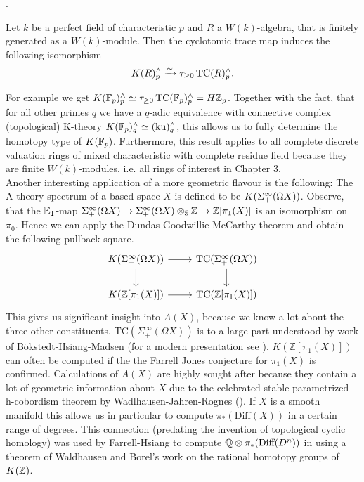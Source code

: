 \cite[Theorem~D]{HMWV}. 
\begin{thm}
    Let $k$ be a perfect field of characteristic $p$ and $R$ a $W(k)$-algebra, that is finitely generated as a $W(k)$-module. Then the cyclotomic trace map induces the following isomorphism
    \begin{align*}
        K(R)_p^{\wedge}\xrightarrow{\sim} \tau_{\geq 0}\operatorname{TC}(R)_p^{\wedge}.
    \end{align*}
\end{thm}
For example we get $K(\mathbb{F}_p)_p^{\wedge}\simeq \tau_{\geq 0}\operatorname{TC}(\mathbb{F}_p)_p^{\wedge}=H\mathbb{Z}_p$. Together with the fact, that for all other primes $q$ we have a $q$-adic equivalence with connective complex (topological) K-theory $K(\mathbb{F}_p)_q^{\wedge}\simeq (\mathrm{ku})_q^{\wedge}$, this allows us to fully determine the homotopy type of $K(\mathbb{F}_p)$. 
Furthermore, this result applies to all complete discrete valuation rings of mixed characteristic with complete residue field because they are finite $W(k)$-modules, i.e. all rings of interest in Chapter 3. \\
Another interesting application of a more geometric flavour is the following: The A-theory spectrum of a based space $X$ is defined to be $K(\Sigma^{\infty}_{+}(\Omega X))$. Observe, that the $\mathbb{E}_1$-map $\Sigma^{\infty}_{+}(\Omega X)\rightarrow \Sigma^{\infty}_{+}(\Omega X)\otimes_{\mathbb{S}}\mathbb{Z}\rightarrow \mathbb{Z}[\pi_1(X)]$ is an isomorphism on $\pi_0$. Hence we can apply the Dundas-Goodwillie-McCarthy theorem and obtain the following pullback square.
\[\begin{tikzcd}
	{K(\Sigma^\infty_+(\Omega X))} & {\mathrm{TC}(\Sigma^\infty_+(\Omega X))} \\
	{K(\mathbb{Z}[\pi_1(X)])} & {\mathrm{TC}(\mathbb{Z}[\pi_1(X)])}
	\arrow[from=1-1, to=1-2]
	\arrow[from=1-2, to=2-2]
	\arrow[from=1-1, to=2-1]
	\arrow[from=2-1, to=2-2]
\end{tikzcd}\]
This gives us significant insight into $A(X)$, because we know a lot about the three other constituents.
${\text{TC}(\Sigma^\infty_+(\Omega X))}$ is to a large part understood by work of Bökstedt-Hsiang-Madsen \cite{BHMtrace} (for a modern presentation see \cite[Section~IV.3]{NS}). 
$K(\mathbb{Z}[\pi_1(X)])$ can often be computed if the the Farrell Jones conjecture for $\pi_1(X)$ is confirmed. 
Calculations of $A(X)$ are highly sought after because they contain a lot of geometric information about $X$ due to the celebrated stable parametrized h-cobordism theorem by Wadlhausen-Jahren-Rognes (\cite{WJR2013spaces}). If $X$ is a smooth manifold this allows us in particular to compute $\pi_*(\mathrm{Diff}(X))$ in a certain range of degrees. This connection (predating the invention of topological cyclic homology) was used by Farrell-Hsiang to compute $\mathbb{Q}\otimes\pi_*(\text{Diff}(D^n))$ in \cite{farrellhsiang1978rational} using a theorem of Waldhausen and Borel's work on the rational homotopy groups of $K(\mathbb{Z})$.
